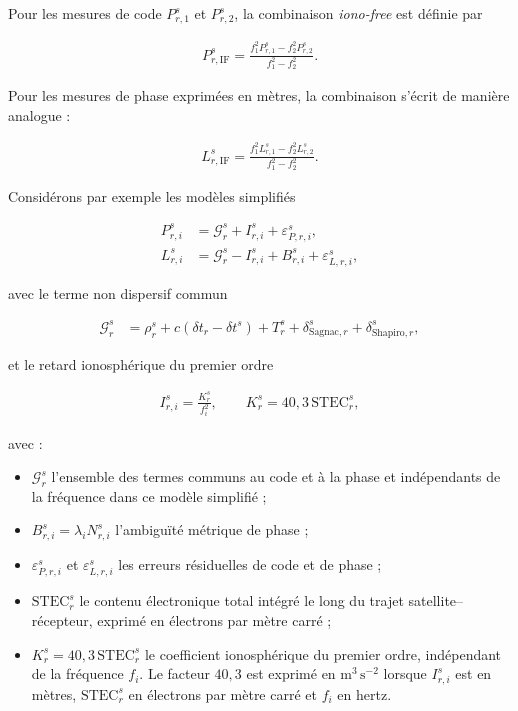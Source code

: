 Pour les mesures de code $P_{r,1}^s$ et $P_{r,2}^s$, la combinaison
\textit{iono-free} est définie par

\begin{align}
P_{r,\mathrm{IF}}^s
=
\frac{
f_1^2P_{r,1}^s-f_2^2P_{r,2}^s
}{
f_1^2-f_2^2
}.
\label{eq:code_iono_free}
\end{align}

Pour les mesures de phase exprimées en mètres, la combinaison s'écrit de
manière analogue :

\begin{align}
L_{r,\mathrm{IF}}^s
=
\frac{
f_1^2L_{r,1}^s-f_2^2L_{r,2}^s
}{
f_1^2-f_2^2
}.
\label{eq:phase_iono_free}
\end{align}

Considérons par exemple les modèles simplifiés

\begin{align}
P_{r,i}^s
&=
\mathcal G_r^s
+
I_{r,i}^s
+
\varepsilon_{P,r,i}^s,
\\
L_{r,i}^s
&=
\mathcal G_r^s
-
I_{r,i}^s
+
B_{r,i}^s
+
\varepsilon_{L,r,i}^s,
\end{align}

avec le terme non dispersif commun

\begin{align}
\mathcal G_r^s
&=
\rho_r^s
+c\left(\delta t_r-\delta t^s\right)
+T_r^s
+\delta_{\mathrm{Sagnac},r}^s
+\delta_{\mathrm{Shapiro},r}^s,
\label{eq:common_nondispersive_term}
\end{align}

et le retard ionosphérique du premier ordre

\begin{align}
I_{r,i}^s
=
\frac{K_r^s}{f_i^2},
\qquad
K_r^s=40{,}3\,\mathrm{STEC}_r^s,
\end{align}

avec :

\begin{itemize}
    \item $\mathcal G_r^s$ l'ensemble des termes communs au code et à la
    phase et indépendants de la fréquence dans ce modèle simplifié ;
    \item $B_{r,i}^s=\lambda_iN_{r,i}^s$ l'ambiguïté métrique de phase ;
    \item $\varepsilon_{P,r,i}^s$ et $\varepsilon_{L,r,i}^s$ les erreurs
    résiduelles de code et de phase ;
    \item $\mathrm{STEC}_r^s$ le contenu électronique total intégré le long
    du trajet satellite--récepteur, exprimé en électrons par mètre carré ;
    \item $K_r^s=40{,}3\,\mathrm{STEC}_r^s$ le coefficient ionosphérique du
    premier ordre, indépendant de la fréquence $f_i$. Le facteur $40{,}3$
    est exprimé en $\mathrm{m^3\,s^{-2}}$ lorsque $I_{r,i}^s$ est en mètres,
    $\mathrm{STEC}_r^s$ en électrons par mètre carré et $f_i$ en hertz.
\end{itemize}

